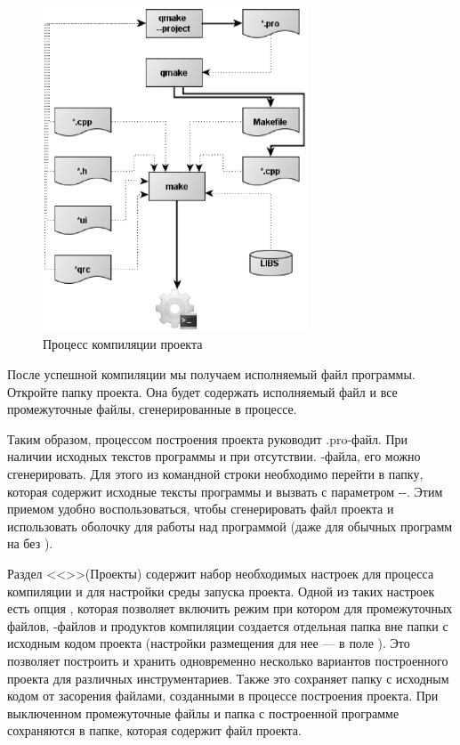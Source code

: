 \begin{figure}[htb]
\begin{center}
\includegraphics[width=0.7\textwidth]{img/ris_12_1}
\caption{Процесс компиляции проекта}
\label{ch12:refDrawing0}
\end{center}
\end{figure}

После успешной компиляции мы получаем исполняемый файл программы. Откройте папку проекта. Она будет
содержать исполняемый файл и все промежуточные файлы, сгенерированные в процессе.

Таким образом, процессом построения проекта руководит .pro-файл. При наличии исходных текстов программы и
при отсутствии. -файла, его можно сгенерировать. Для этого из командной строки
необходимо перейти в папку, которая содержит исходные тексты программы и вызвать 
с параметром -{-}. Этим приемом удобно
воспользоваться, чтобы сгенерировать файл проекта и использовать оболочку 
для работы над программой (даже для обычных программ на  без ).

Раздел <<>>(Проекты) содержит набор
необходимых настроек для процесса компиляции и для настройки среды запуска проекта. Одной
из таких настроек есть опция , которая 
позволяет включить режим при котором для промежуточных файлов,
-файлов и продуктов компиляции создается отдельная папка вне папки с исходным кодом проекта
(настройки размещения для нее --- в поле ). Это позволяет построить и
хранить одновременно несколько вариантов построенного проекта для различных инструментариев. Также это сохраняет папку
с исходным кодом от засорения файлами, созданными в процессе построения проекта. При выключенном  промежуточные файлы и папка с построенной программе сохраняются в папке, которая содержит файл
проекта.


